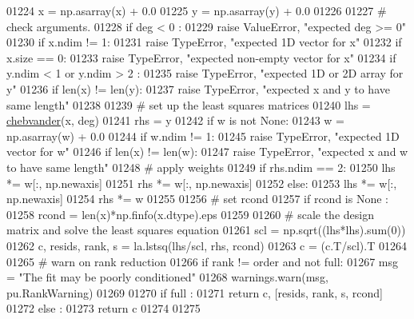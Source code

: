 \begin{DoxyCode}
01224     x = np.asarray(x) + 0.0
01225     y = np.asarray(y) + 0.0
01226 
01227     \textcolor{comment}{# check arguments.}
01228     \textcolor{keywordflow}{if} deg < 0 :
01229         \textcolor{keywordflow}{raise} ValueError, \textcolor{stringliteral}{"expected deg >= 0"}
01230     \textcolor{keywordflow}{if} x.ndim != 1:
01231         \textcolor{keywordflow}{raise} TypeError, \textcolor{stringliteral}{"expected 1D vector for x"}
01232     \textcolor{keywordflow}{if} x.size == 0:
01233         \textcolor{keywordflow}{raise} TypeError, \textcolor{stringliteral}{"expected non-empty vector for x"}
01234     \textcolor{keywordflow}{if} y.ndim < 1 \textcolor{keywordflow}{or} y.ndim > 2 :
01235         \textcolor{keywordflow}{raise} TypeError, \textcolor{stringliteral}{"expected 1D or 2D array for y"}
01236     \textcolor{keywordflow}{if} len(x) != len(y):
01237         \textcolor{keywordflow}{raise} TypeError, \textcolor{stringliteral}{"expected x and y to have same length"}
01238 
01239     \textcolor{comment}{# set up the least squares matrices}
01240     lhs = \hyperlink{namespacepyneb_1_1utils_1_1chebyshev_aa9deae857486c8ee69362ded985b09d8}{chebvander}(x, deg)
01241     rhs = y
01242     \textcolor{keywordflow}{if} w \textcolor{keywordflow}{is} \textcolor{keywordflow}{not} \textcolor{keywordtype}{None}:
01243         w = np.asarray(w) + 0.0
01244         \textcolor{keywordflow}{if} w.ndim != 1:
01245             \textcolor{keywordflow}{raise} TypeError, \textcolor{stringliteral}{"expected 1D vector for w"}
01246         \textcolor{keywordflow}{if} len(x) != len(w):
01247             \textcolor{keywordflow}{raise} TypeError, \textcolor{stringliteral}{"expected x and w to have same length"}
01248         \textcolor{comment}{# apply weights}
01249         \textcolor{keywordflow}{if} rhs.ndim == 2:
01250             lhs *= w[:, np.newaxis]
01251             rhs *= w[:, np.newaxis]
01252         \textcolor{keywordflow}{else}:
01253             lhs *= w[:, np.newaxis]
01254             rhs *= w
01255 
01256     \textcolor{comment}{# set rcond}
01257     \textcolor{keywordflow}{if} rcond \textcolor{keywordflow}{is} \textcolor{keywordtype}{None} :
01258         rcond = len(x)*np.finfo(x.dtype).eps
01259 
01260     \textcolor{comment}{# scale the design matrix and solve the least squares equation}
01261     scl = np.sqrt((lhs*lhs).sum(0))
01262     c, resids, rank, s = la.lstsq(lhs/scl, rhs, rcond)
01263     c = (c.T/scl).T
01264 
01265     \textcolor{comment}{# warn on rank reduction}
01266     \textcolor{keywordflow}{if} rank != order \textcolor{keywordflow}{and} \textcolor{keywordflow}{not} full:
01267         msg = \textcolor{stringliteral}{"The fit may be poorly conditioned"}
01268         warnings.warn(msg, pu.RankWarning)
01269 
01270     \textcolor{keywordflow}{if} full :
01271         \textcolor{keywordflow}{return} c, [resids, rank, s, rcond]
01272     \textcolor{keywordflow}{else} :
01273         \textcolor{keywordflow}{return} c
01274 
01275 
\end{DoxyCode}
\hypertarget{namespacepyneb_1_1utils_1_1chebyshev_abedf5cf14ea9229321fc5e4043c42a0d}{}
